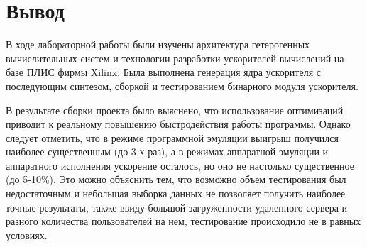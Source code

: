 \newpage

\chapter{Вывод}
В ходе лабораторной работы были изучены архитектура гетерогенных вычислительных систем и технологии разработки ускорителей вычислений на базе ПЛИС фирмы Xilinx. Была выполнена генерация ядра ускорителя с последующим синтезом, сборкой и тестированием бинарного модуля ускорителя.

В результате сборки проекта было выяснено, что использование оптимизаций приводит к реальному повышению быстродействия работы программы. Однако следует отметить, что в режиме программной эмуляции выигрыш получился наиболее существенным (до 3-х раз), а в режимах аппаратной эмуляции и аппаратного исполнения ускорение осталось, но оно не настолько существенное (до 5-10\%). Это можно объяснить тем, что возможно объем тестирования был недостаточным и небольшая выборка данных не позволяет получить наиболее точные результаты, также ввиду большой загруженности удаленного сервера и разного количества пользователей на нем, тестирование происходило не в равных условиях.
